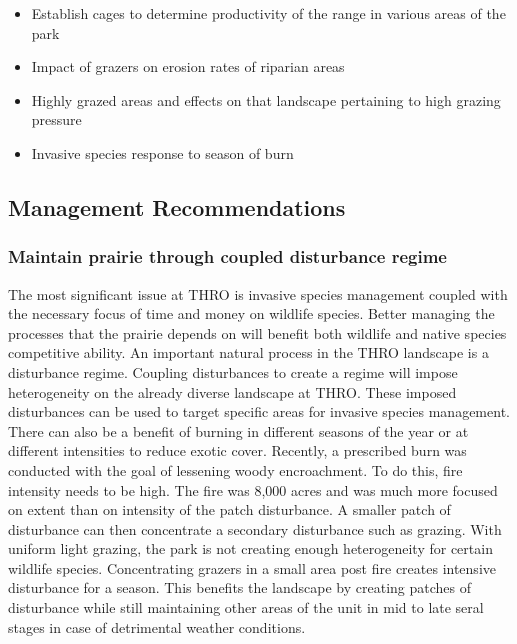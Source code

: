 \begin{itemize}
\item Establish cages to determine productivity of the range in various areas of the park
\item Impact of grazers on erosion rates of riparian areas 
 \item Highly grazed areas and effects on that landscape pertaining to high grazing pressure
\item Invasive species response to season of burn
\end{itemize}

\subsection{Management Recommendations}

\subsubsection{Maintain prairie through coupled disturbance regime}

The most significant issue at THRO is invasive species management coupled with the necessary focus of time and money on wildlife species.
Better managing the processes that the prairie depends on will benefit both wildlife and native species competitive ability. 
An important natural process in the THRO landscape is a disturbance regime. 
Coupling disturbances to create a regime will impose heterogeneity on the already diverse landscape at THRO. 
These imposed disturbances can be used to target specific areas for invasive species management. 
There can also be a benefit of burning in different seasons of the year or at different intensities to reduce exotic cover. 
Recently, a prescribed burn was conducted with the goal of lessening woody encroachment. 
To do this, fire intensity needs to be high. 
The fire was 8,000 acres and was much more focused on extent than on intensity of the patch disturbance. 
A smaller patch of disturbance can then concentrate a secondary disturbance such as grazing. 
With uniform light grazing, the park is not creating enough heterogeneity for certain wildlife species. 
Concentrating grazers in a small area post fire creates intensive disturbance for a season. 
This benefits the landscape by creating patches of disturbance while still maintaining other areas of the unit in mid to late seral stages in case of detrimental weather conditions.

